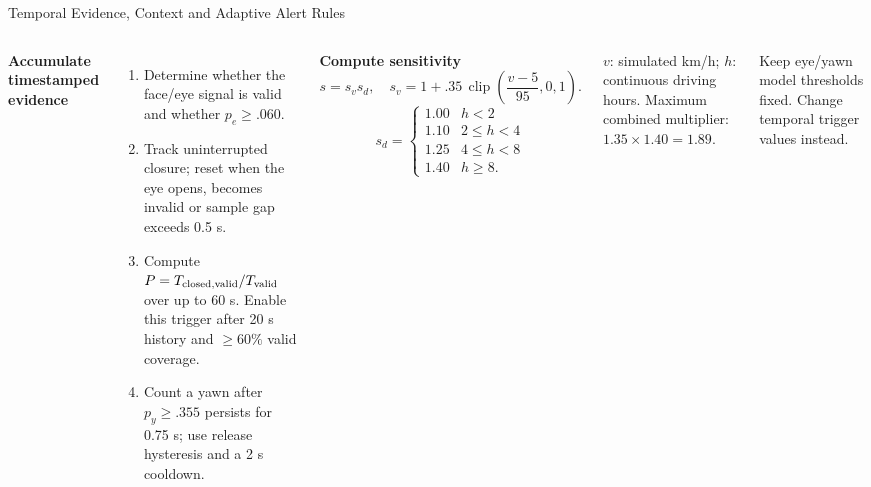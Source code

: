 \documentclass[aspectratio=169,10pt]{beamer}
\renewcommand{\arraystretch}{1.22}
\newcommand{\smallnote}[1]{{\footnotesize\color{DarkSlate}#1\par}}
\begin{document}
\begin{frame}[t]{Temporal Evidence, Context and Adaptive Alert Rules}
\fontsize{10}{11.5}\selectfont
\renewcommand{\arraystretch}{1.06}
\setlength{\tabcolsep}{4pt}
\setlength{\abovedisplayskip}{4pt}
\setlength{\belowdisplayskip}{4pt}
\begin{columns}[T,onlytextwidth]
\textbf{Accumulate timestamped evidence}
\begin{enumerate}\setlength\itemsep{0pt}
\item Determine whether the face/eye signal is valid and whether $p_e\ge .060$.
\item Track uninterrupted closure; reset when the eye opens, becomes invalid or sample gap exceeds 0.5 s.
\item Compute $P=T_{\rm closed,valid}/T_{\rm valid}$ over up to 60 s. Enable this trigger after 20 s history and $\ge60\%$ valid coverage.
\item Count a yawn after $p_y\ge .355$ persists for 0.75 s; use release hysteresis and a 2 s cooldown.
\end{enumerate}
\textbf{Compute sensitivity}
\[s=s_v s_d,\quad s_v=1+.35\,\operatorname{clip}\!\left(\frac{v-5}{95},0,1\right).\]
\[s_d=\begin{cases}1.00&h<2\\1.10&2\le h<4\\1.25&4\le h<8\\1.40&h\ge8.\end{cases}\]
\smallnote{$v$: simulated km/h; $h$: continuous driving hours. Maximum combined multiplier: $1.35\times1.40=1.89$.}
\par\vspace{1pt}
Keep eye/yawn model thresholds fixed. Change temporal trigger values instead.


\end{columns}
\end{frame}
\end{document}
